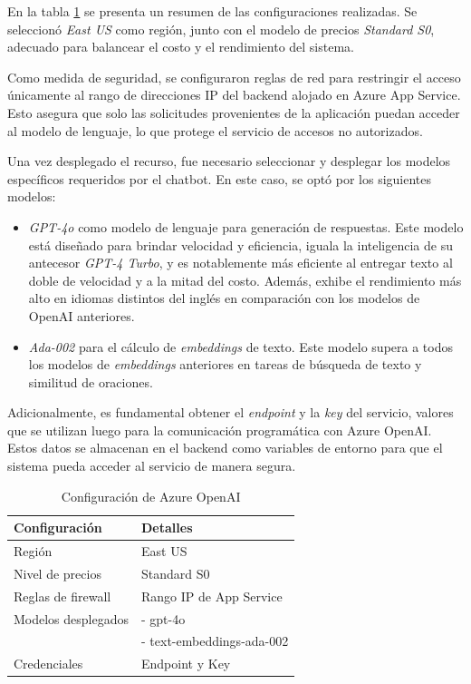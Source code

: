 En la tabla \ref{tab:config-openai} se presenta un resumen de las configuraciones realizadas. 
Se seleccionó \textit{East US} como región, junto con el modelo de precios \textit{Standard S0}, 
adecuado para balancear el costo y el rendimiento del sistema.

Como medida de seguridad, se configuraron reglas de red para restringir el acceso únicamente al rango 
de direcciones IP del backend alojado en Azure App Service. Esto asegura que solo las solicitudes provenientes de la 
aplicación puedan acceder al modelo de lenguaje, lo que protege el servicio de accesos no autorizados.

Una vez desplegado el recurso, fue necesario seleccionar y desplegar los modelos específicos requeridos por el chatbot. 
En este caso, se optó por los siguientes modelos:

\begin{itemize}
	\item \textit{GPT-4o} como modelo de lenguaje para generación de respuestas. Este modelo está diseñado para brindar velocidad 
  y eficiencia, iguala la inteligencia de su antecesor \textit{GPT-4 Turbo}, y es notablemente más eficiente al entregar texto al 
  doble de velocidad y a la mitad del costo. Además, exhibe el rendimiento más alto en idiomas distintos del inglés en comparación 
  con los modelos de OpenAI anteriores.
	\item \textit{Ada-002} para el cálculo de \textit{embeddings} de texto. Este modelo supera a todos los modelos de \textit{embeddings} 
  anteriores en tareas de búsqueda de texto y similitud de oraciones.
\end{itemize}

Adicionalmente, es fundamental obtener el \textit{endpoint} y la \textit{key} del servicio, valores que se utilizan luego para la comunicación programática 
con Azure OpenAI. Estos datos se almacenan en el backend como variables de entorno para que el sistema pueda acceder al servicio de manera segura.

\begin{table}[h]
	\centering
	\caption[Configuración de Azure OpenAI]{Configuración de Azure OpenAI}
	\begin{tabular}{l l}    
		\toprule
		\textbf{Configuración} 	 & \textbf{Detalles} 	\\
		\midrule
		Región              &	East US 				        \\		
		Nivel de precios    & Standard S0				      \\
		Reglas de firewall  & Rango IP de App Service \\
    Modelos desplegados	& - gpt-4o				          \\
            	          & - text-embeddings-ada-002	\\
    Credenciales	      & Endpoint y Key 		      \\
		\bottomrule
		\hline
	\end{tabular}
	\label{tab:config-openai}
\end{table}

